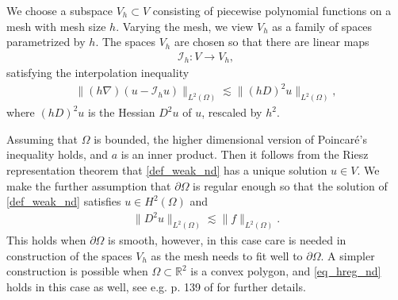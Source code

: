 \documentclass[12pt,oneside]{amsart}
\def\p{\partial}
\def\R{\mathbb R}
\def\I{\mathcal I}
\begin{document}
We choose a subspace $V_h \subset V$ consisting of piecewise polynomial functions on a mesh with mesh size $h$. Varying the mesh, we view $V_h$ as a family of spaces parametrized by $h$. The spaces $V_h$ are chosen so that there are linear maps
    \begin{align*}
\I_h : V \to V_h,
    \end{align*}  
satisfying the interpolation inequality 
    \begin{align}\label{eq_interp_nd}
\|(h\nabla)(u - \I_h u)\|_{L^2(\Omega)} \lesssim \|(hD)^2 u\|_{L^2(\Omega)},
    \end{align}
where $(hD)^2 u$ is the Hessian $D^2 u$ of $u$, rescaled by $h^2$.

Assuming that $\Omega$ is bounded, the higher dimensional version of Poincar\'e's inequality holds, and $a$ is an inner product. Then it follows from the Riesz representation theorem that 
\eqref{def_weak_nd} has a unique solution $u \in V$.
We make the further assumption that $\p \Omega$ is regular enough so that the solution of \eqref{def_weak_nd} satisfies $u \in H^2(\Omega)$ and 
    \begin{align}\label{eq_hreg_nd}
\|D^2 u\|_{L^2(\Omega)} \lesssim \|f\|_{L^2(\Omega)}.
    \end{align}
This holds when $\p \Omega$ is smooth, however, in this case care is needed in construction of the spaces $V_h$ as the mesh needs to fit well to $\p \Omega$. A simpler construction is possible when $\Omega \subset \R^2$ is a convex polygon, and \eqref{eq_hreg_nd} holds in this case as well, see e.g. p. 139 of \cite{BS} for further details. 
\end{document}
